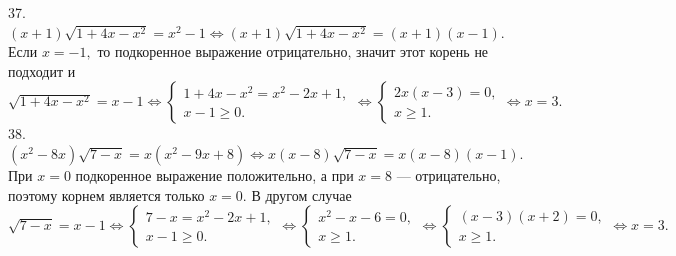 \documentclass[12pt]{article}
\begin{document}
37. $(x+1)\sqrt{1+4x-x^2}=x^2-1\Leftrightarrow (x+1)\sqrt{1+4x-x^2}=(x+1)(x-1).$ Если $x=-1,$ то подкоренное выражение отрицательно, значит этот корень не подходит и $\sqrt{1+4x-x^2}=x-1\Leftrightarrow\begin{cases}1+4x-x^2=x^2-2x+1,\\ x-1\geqslant0.\end{cases}
\Leftrightarrow\begin{cases}2x(x-3)=0,\\ x\geqslant1.\end{cases}\Leftrightarrow
x=3.$\\
38. $(x^2-8x)\sqrt{7-x}=x(x^2-9x+8)\Leftrightarrow x(x-8)\sqrt{7-x}=x(x-8)(x-1).$ При $x=0$ подкоренное выражение положительно, а при $x=8$ --- отрицательно, поэтому корнем является только $x=0.$ В другом случае $\sqrt{7-x}=x-1\Leftrightarrow \begin{cases} 7-x=x^2-2x+1,\\ x-1\geqslant0.\end{cases}
\Leftrightarrow \begin{cases} x^2-x-6=0,\\ x\geqslant1.\end{cases}
\Leftrightarrow \begin{cases} (x-3)(x+2)=0,\\ x\geqslant1.\end{cases}\Leftrightarrow x=3.$
\end{document}

